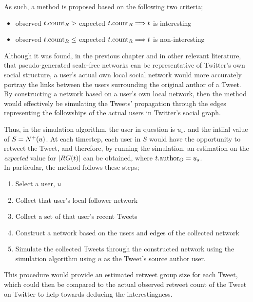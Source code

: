 As such, a method is proposed based on the following two criteria;
\begin{itemize}
    \item observed $t.\textrm{count}_R >$ expected $t.\textrm{count}_R \Longrightarrow t$ is interesting
    \item observed $t.\textrm{count}_R \leq$ expected $t.\textrm{count}_R \Longrightarrow t$ is non-interesting
\end{itemize}

Although it was found, in the previous chapter and in other relevant literature, that pseudo-generated scale-free networks can be representative of Twitter's own social structure, a user's actual own local social network would more accurately portray the links between the users surrounding the original author of a Tweet. By constructing a network based on a user's own local network, then the method would effectively be simulating the Tweets' propagation through the edges representing the followships of the actual users in Twitter's social graph.

Thus, in the simulation algorithm, the user in question is $u_s$, and the intiial value of $S = N^+(u)$. At each timestep, each user in $S$ would have the opportunity to retweet the Tweet, and therefore, by running the simulation, an estimation on the \textit{expected} value for $|RG(t)|$ can be obtained, where $t.\textrm{author}_O = u_s$.\\
In particular, the method follows these steps;
\begin{enumerate}
    \item Select a user, $u$
    \item Collect that user's local follower network 
    \item Collect a set of that user's recent Tweets
    \item Construct a network based on the users and edges of the collected network
    \item Simulate the collected Tweets through the constructed network using the simulation algorithm using $u$ as the Tweet's source author user.
\end{enumerate}

This procedure would provide an estimated retweet group size for each Tweet, which could then be compared to the actual observed retweet count of the Tweet on Twitter to help towards deducing the interestingness.


